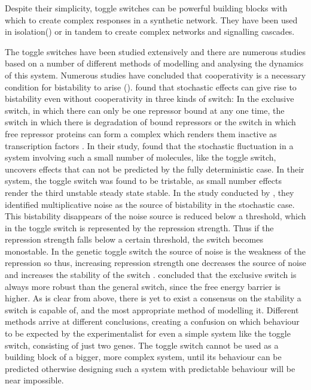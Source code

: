 Despite their simplicity, toggle switches can be powerful building blocks with which to create complex responses in a synthetic network. They have been used in isolation() or in tandem to create complex networks and signalling cascades. 

The toggle switches have been studied extensively and there are numerous studies based on a number of different methods of modelling and analysing the dynamics of this system. Numerous studies have concluded that cooperativity is a necessary condition for bistability to arise (). \textcite{Lipshtat:2006wb} found that stochastic effects can give rise to bistability even without cooperativity in three kinds of switch: In the exclusive switch, in which there can only be one repressor bound at any one time, the switch in which there is degradation of bound repressors or the switch in which free repressor proteins can form a complex which renders them inactive as transcription factors \autocite{Lipshtat:2006wb}. In their study, \textcite{Ma:2012dt} found that the stochastic fluctuation in a system involving such a small number of molecules, like the toggle switch, uncovers effects that can not be predicted by the fully deterministic case. In their system, the toggle switch was found to be tristable, as small number effects render the third unstable steady state stable. In the study conducted by \textcite{Biancalani:2015vy}, they identified multiplicative noise as the source of bistability in the stochastic case. This bistability disappears of the noise source is reduced below a threshold, which in the toggle switch is represented by the repression strength. Thus if the repression strength falls below a certain threshold, the switch becomes monostable. In the genetic toggle switch the source of noise is the weakness of the repression so thus, increasing repression strength one decreases the source of noise and increases the stability of the switch \autocite{Warren:2005kea}. \textcite{Warren:2005kea} concluded that the exclusive switch is always more robust than the general switch, since the free energy barrier is higher. As is clear from above, there is yet to exist a consensus on the stability a switch is capable of, and the most appropriate method of modelling it. Different methods arrive at different conclusions, creating a confusion on which behaviour to be expected by the experimentalist for even a simple system like the toggle switch, consisting of just two genes. The toggle switch cannot be used as a building block of a bigger, more complex system, until its behaviour can be predicted otherwise designing such a system with predictable behaviour will be near impossible.

